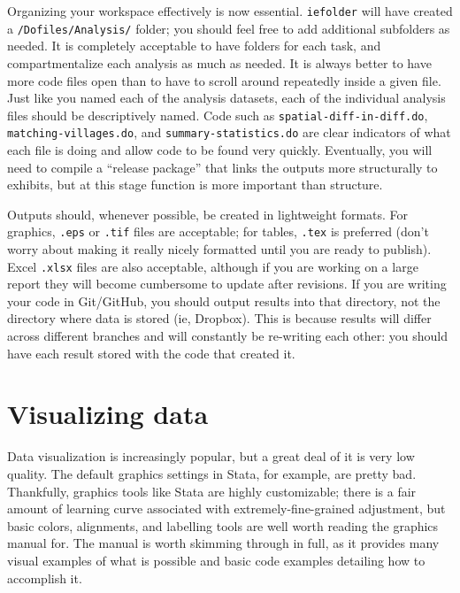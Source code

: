 Organizing your workspace effectively is now essential.
\texttt{iefolder} will have created a \texttt{/Dofiles/Analysis/} folder;
you should feel free to add additional subfolders as needed.
It is completely acceptable to have folders for each task,
and compartmentalize each analysis as much as needed.
It is always better to have more code files open
than to have to scroll around repeatedly inside a given file.
Just like you named each of the analysis datasets,
each of the individual analysis files should be descriptively named.
Code such as \texttt{spatial-diff-in-diff.do},
\texttt{matching-villages.do}, and \texttt{summary-statistics.do}
are clear indicators of what each file is doing
and allow code to be found very quickly.
Eventually, you will need to compile a ``release package''
that links the outputs more structurally to exhibits,
but at this stage function is more important than structure.

Outputs should, whenever possible, be created in lightweight formats.
For graphics, \texttt{.eps} or \texttt{.tif} files are acceptable;
for tables, \texttt{.tex} is preferred (don't worry about making it
really nicely formatted until you are ready to publish).
Excel \texttt{.xlsx} files are also acceptable,
although if you are working on a large report
they will become cumbersome to update after revisions.
If you are writing your code in Git/GitHub,
you should output results into that directory,
not the directory where data is stored (ie, Dropbox).
This is because results will differ across different branches
and will constantly be re-writing each other:
you should have each result stored with the code that created it.


\section{Visualizing data}

Data visualization is increasingly popular,
but a great deal of it is very low quality.\cite{healy2018data,wilke2019fundamentals}
The default graphics settings in Stata, for example,
are pretty bad.
Thankfully, graphics tools like Stata are highly customizable;
there is a fair amount of learning curve associated with
extremely-fine-grained adjustment,
but basic colors, alignments, and labelling tools
are well worth reading the graphics manual for.
The manual is worth skimming through in full, as it provides
many visual examples of what is possible and basic code examples
detailing how to accomplish it.

